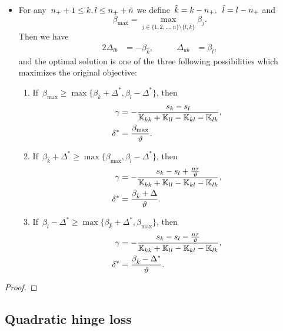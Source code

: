 \begin{theorem}
\begin{itemize}
    \item For any~$n_{+} + 1\le k,l \le n_{+} + \tilde{n}$ we define~$\hat{k} = k - n_{+},$~$\hat{l} = l - n_{+}$ and
    \begin{equation*}
      \beta_{\max}
        = \max_{j \in \{1, 2, \ldots, n\} \setminus \{\hat{l}, \hat{k}\}} \beta_j.
    \end{equation*}
    Then we have
    \begin{alignat*}{2}
      \Delta_{lb} & = - \beta_{\hat{k}}, & \qquad
      \Delta_{ub} & = \beta_{\hat{l}},
    \end{alignat*}
    and the optimal solution is one of the three following possibilities which maximizes the original objective:
    \begin{enumerate}
      \item If~$\beta_{\max} \geq \max\{\beta_{\hat{k}} + \Delta^{*}, \beta_{\hat{l}} - \Delta^{*}\}$, then
      \begin{align*}
        \gamma     & = -\frac{s_k - s_l}{\mathbb{K}_{kk} + \mathbb{K}_{ll} - \mathbb{K}_{kl} - \mathbb{K}_{lk}}, \\
        \delta^{*} & = \frac{\beta_{\max}}{\vartheta}.
      \end{align*}
      \item If~$\beta_{\hat{k}} + \Delta^{*} \geq \max\{\beta_{\max} , \beta_{\hat{l}} - \Delta^{*}\}$, then
      \begin{align*}
        \gamma     & = -\frac{s_k - s_l + \frac{n\tau}{\vartheta}}{\mathbb{K}_{kk} + \mathbb{K}_{ll} - \mathbb{K}_{kl} - \mathbb{K}_{lk}}, \\
        \delta^{*} & = \frac{\beta_{\hat{k}} + \Delta}{\vartheta}.
      \end{align*}
      \item If~$\beta_{\hat{l}} - \Delta^{*} \geq \max\{\beta_{\hat{k}} + \Delta^{*}, \beta_{\max}\}$, then
      \begin{align*}
        \gamma     & = -\frac{s_k - s_l - \frac{n\tau}{\vartheta}}{\mathbb{K}_{kk} + \mathbb{K}_{ll} - \mathbb{K}_{kl} - \mathbb{K}_{lk}}, \\
        \delta^{*} & = \frac{\beta_{\hat{k}} - \Delta^{*}}{\vartheta}.
      \end{align*}
    \end{enumerate}
  \end{itemize}
\end{theorem}
\begin{proof}
\end{proof}

\subsection{Quadratic hinge loss}\label{sec: Delta for quadratic hinge}

